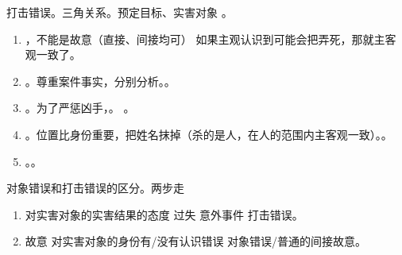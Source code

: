 \begin{enumerate}
\begin{enumerate}
\begin{enumerate}
                        \begin{kk}{打击错误。三角关系。预定目标、实害对象}
                          。
                          \begin{enumerate}
                            \item {}，不能是故意（直接、间接均可） \yjt 如果主观认识到可能会把弄死，那就主客观一致了。
                            \item {}。尊重案件事实，分别分析。。
                            \item {}。为了严惩凶手，。
                                  。
                            \item {}。位置比身份重要，把姓名抹掉（杀的是人，在人的范围内主客观一致）。。
                            \item {}。。
                          \end{enumerate}
                        \end{kk}

                        \begin{kk}{对象错误和打击错误的区分。两步走}
                          \begin{enumerate}
                            \item 对实害对象的实害结果的态度 \yjt 过失 \hz 意外事件 \yjt 打击错误。
                            \item 故意 \yjt 对实害对象的身份有/没有认识错误 \yjt 对象错误/普通的间接故意。
                          \end{enumerate}
                        \end{kk}


\end{enumerate}
\end{enumerate}
\end{enumerate}

